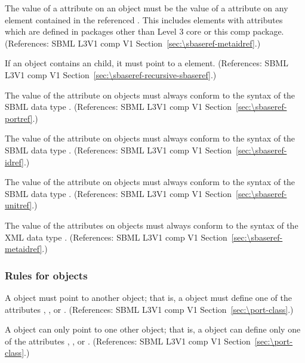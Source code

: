 \begin{sbmlenum}
 { The value of a  attribute on an \SBaseRef
  object must be the value of a  attribute on any element
  contained in the referenced \Model.  This includes elements with 
  attributes which are defined in packages other than Level 3 core or
  this comp package. 
  (References: SBML L3V1 comp V1 Section~\ref{sec:\sbaseref-metaidref}.) }


 { If an \SBaseRef object contains an \SBaseRef child,
  it must point to a \Submodel element. 
  (References: SBML L3V1 comp V1 Section~\ref{sec:\sbaseref-recursive-sbaseref}.) }


 { The value of the  attribute 
  on \SBaseRef objects must always conform to the syntax of
  the SBML data type .
  (References: SBML L3V1 comp V1 Section~\ref{sec:\sbaseref-portref}.) }


 { The value of the 
  attribute on \SBaseRef objects must always conform to the syntax of
  the SBML data type .
  (References: SBML L3V1 comp V1 Section~\ref{sec:\sbaseref-idref}.) }


 { The value of the  attribute on
  \SBaseRef objects must always conform to the syntax of the SBML data
  type .
  (References: SBML L3V1 comp V1 Section~\ref{sec:\sbaseref-unitref}.) }


 { The value of the  attributes on
  \SBaseRef objects must always conform to the syntax of the XML data
  type .
  (References: SBML L3V1 comp V1 Section~\ref{sec:\sbaseref-metaidref}.) }


\end{sbmlenum} \subsubsection*{Rules for  objects} \begin{sbmlenum}

 { A \Port object must point to another object; that is,
  a \Port object must define one of the attributes 
  , , or . 
  (References: SBML L3V1 comp V1 Section~\ref{sec:\port-class}.) }


 { A \Port object can only point to one other object; that is,
  a \Port object can define only one of the attributes 
  , , or .
  (References: SBML L3V1 comp V1 Section~\ref{sec:\port-class}.) }



\end{sbmlenum}
